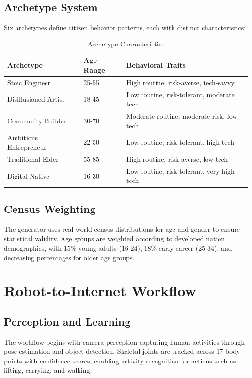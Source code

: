 \documentclass[12pt,a4paper]{article}
\begin{document}
\subsection{Archetype System}

Six archetypes define citizen behavior patterns, each with distinct characteristics:

\begin{table}[h]
\centering
\begin{tabular}{llp{5cm}}
\toprule
Archetype & Age Range & Behavioral Traits \\
\midrule
Stoic Engineer & 25-55 & High routine, risk-averse, tech-savvy \\
Disillusioned Artist & 18-45 & Low routine, risk-tolerant, moderate tech \\
Community Builder & 30-70 & Moderate routine, moderate risk, low tech \\
Ambitious Entrepreneur & 22-50 & Low routine, risk-tolerant, high tech \\
Traditional Elder & 55-85 & High routine, risk-averse, low tech \\
Digital Native & 16-30 & Low routine, risk-tolerant, very high tech \\
\bottomrule
\end{tabular}
\caption{Archetype Characteristics}
\label{tab:archetypes}
\end{table}

\subsection{Census Weighting}

The generator uses real-world census distributions for age and gender to ensure statistical validity. Age groups are weighted according to developed nation demographics, with 15\% young adults (16-24), 18\% early career (25-34), and decreasing percentages for older age groups.

\section{Robot-to-Internet Workflow}

\subsection{Perception and Learning}

The workflow begins with camera perception capturing human activities through pose estimation and object detection. Skeletal joints are tracked across 17 body points with confidence scores, enabling activity recognition for actions such as lifting, carrying, and walking.
\end{document}
